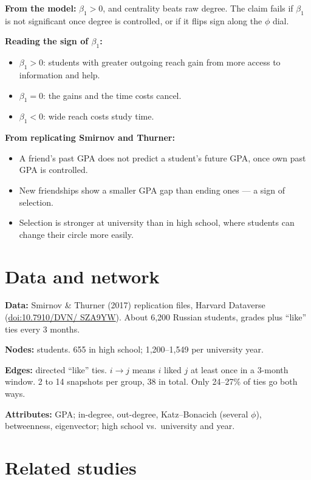 \documentclass[11pt]{article}
\begin{document}
\textbf{From the model:} $\beta_1 > 0$, and centrality beats raw degree. The claim
fails if $\beta_1$ is not significant once degree is controlled, or if it flips sign
along the $\phi$ dial.

\textbf{Reading the sign of $\beta_1$:}
\begin{itemize}
  \item $\beta_1 > 0$: students with greater outgoing reach gain from more access to information and help.
  \item $\beta_1 = 0$: the gains and the time costs cancel.
  \item $\beta_1 < 0$: wide reach costs study time.
\end{itemize}

\textbf{From replicating Smirnov and Thurner:}
\begin{itemize}
  \item A friend's past GPA does not predict a student's future GPA, once own past GPA
        is controlled.
  \item New friendships show a smaller GPA gap than ending ones --- a sign of selection.
  \item Selection is stronger at university than in high school, where students can
        change their circle more easily.
\end{itemize}

\section*{Data and network}

\textbf{Data:} Smirnov \& Thurner (2017) replication files, Harvard Dataverse
(\href{https://doi.org/10.7910/DVN/SZA9YW}{doi:10.7910/\allowbreak DVN/\allowbreak
SZA9YW}). About 6{,}200 Russian students, grades plus ``like'' ties every 3 months.

\textbf{Nodes:} students. 655 in high school; 1{,}200--1{,}549 per university year.

\textbf{Edges:} directed ``like'' ties. $i \to j$ means $i$ liked $j$ at least once in a
3-month window. 2 to 14 snapshots per group, 38 in total. Only 24--27\% of ties go both
ways.

\textbf{Attributes:} GPA; in-degree, out-degree, Katz--Bonacich (several $\phi$),
betweenness, eigenvector; high school vs.\ university and year.

\section*{Related studies}
\end{document}
